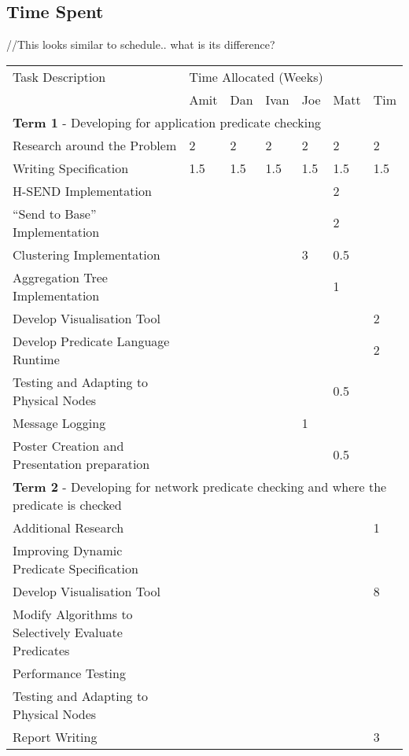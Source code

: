 \subsection{Time Spent}

//This looks similar to schedule.. what is its difference?

\begin{table}[H]
	\centering
	\begin{tabular}{| l | l | l | l | l | l | l |}
	\hline
	Task Description & \multicolumn{6}{l|}{Time Allocated (Weeks)}\\
	~ & Amit & Dan & Ivan & Joe & Matt & Tim \\
	\hline
	\hline
	\multicolumn{7}{|l|}{\textbf{Term 1} - Developing for application predicate checking} \\
	\hline


	Research around the Problem & 2 & 2 & 2 & 2 & 2 & 2\\
	Writing Specification & 1.5 & 1.5 & 1.5 & 1.5 & 1.5 & 1.5\\
	H-SEND Implementation & ~ & ~ & ~ & ~ & 2 & ~\\
	``Send to Base'' Implementation & ~ & ~ & ~ & ~ & 2 & ~\\
	Clustering Implementation & ~ & ~ & ~ & 3 & 0.5 & ~\\
	Aggregation Tree Implementation & ~ & ~ & ~ & ~ & 1 & ~\\
	Develop Visualisation Tool & ~ & ~ & ~ & ~ & ~ & 2\\
	Develop Predicate Language Runtime & ~ & ~ & ~ & ~ & ~ & 2\\
	Testing and Adapting to Physical Nodes & ~ & ~ & ~ & ~ & 0.5 & ~\\
	Message Logging & ~ & ~ & ~ & 1 & ~ & ~\\
	Poster Creation and Presentation preparation & ~ & ~ & ~ & ~ & 0.5 & ~\\

	\hline
	\hline
	\multicolumn{7}{|l|}{\textbf{Term 2} - Developing for network predicate checking and where the predicate is checked} \\
	\hline
	
	Additional Research & ~ & ~ & ~ & ~ & ~ & 1\\
	Improving Dynamic Predicate Specification & ~ & ~ & ~ & ~ & ~ & ~\\
	Develop Visualisation Tool & ~ & ~ & ~ & ~ & ~ & 8\\
	Modify Algorithms to Selectively Evaluate Predicates & ~ & ~ & ~ & ~ & ~ & ~\\
	Performance Testing & ~ & ~ & ~ & ~ & ~ & ~\\
	Testing and Adapting to Physical Nodes & ~ & ~ & ~ & ~ & ~ & ~\\
	Report Writing & ~ & ~ & ~ & ~ & ~ & 3\\
	
	\hline
	
	\end{tabular}
\end{table}

